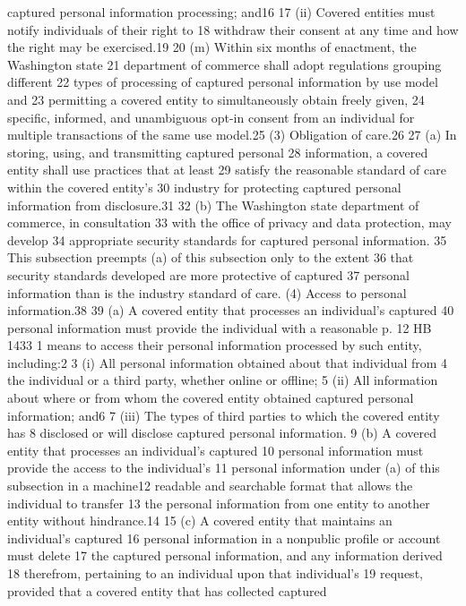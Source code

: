 captured personal information processing; and16
17 (ii) Covered entities must notify individuals of their right to
18 withdraw their consent at any time and how the right may be
exercised.19
20 (m) Within six months of enactment, the Washington state
21 department of commerce shall adopt regulations grouping different
22 types of processing of captured personal information by use model and
23 permitting a covered entity to simultaneously obtain freely given,
24 specific, informed, and unambiguous opt-in consent from an individual
for multiple transactions of the same use model.25
(3) Obligation of care.26
27 (a) In storing, using, and transmitting captured personal
28 information, a covered entity shall use practices that at least
29 satisfy the reasonable standard of care within the covered entity's
30 industry for protecting captured personal information from
disclosure.31
32 (b) The Washington state department of commerce, in consultation
33 with the office of privacy and data protection, may develop
34 appropriate security standards for captured personal information.
35 This subsection preempts (a) of this subsection only to the extent
36 that security standards developed are more protective of captured
37 personal information than is the industry standard of care.
(4) Access to personal information.38
39 (a) A covered entity that processes an individual's captured
40 personal information must provide the individual with a reasonable
p. 12 HB 1433
1 means to access their personal information processed by such entity,
including:2
3 (i) All personal information obtained about that individual from
4 the individual or a third party, whether online or offline;
5 (ii) All information about where or from whom the covered entity
obtained captured personal information; and6
7 (iii) The types of third parties to which the covered entity has
8 disclosed or will disclose captured personal information.
9 (b) A covered entity that processes an individual's captured
10 personal information must provide the access to the individual's
11 personal information under (a) of this subsection in a machine12 readable and searchable format that allows the individual to transfer
13 the personal information from one entity to another entity without
hindrance.14
15 (c) A covered entity that maintains an individual's captured
16 personal information in a nonpublic profile or account must delete
17 the captured personal information, and any information derived
18 therefrom, pertaining to an individual upon that individual's
19 request, provided that a covered entity that has collected captured
